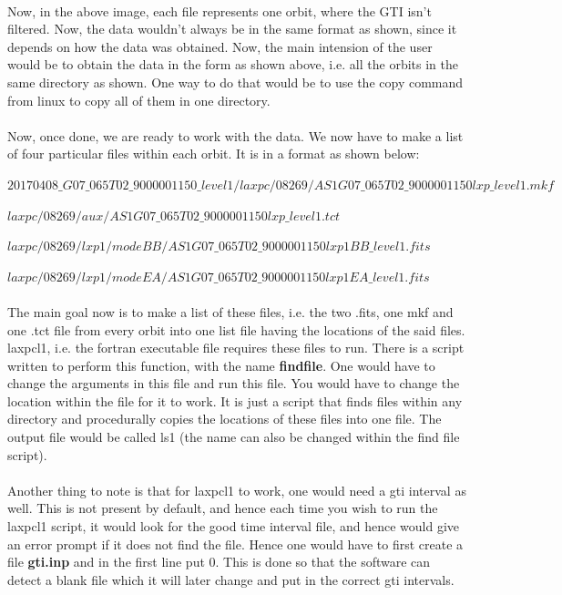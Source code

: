 \documentclass[a4paper,twoside]{report}
\numberwithin{equation}{section}
\begin{document}
\paragraph{}
Now, in the above image, each file represents one orbit, where the GTI isn't filtered. Now, the data wouldn't always be in the same format as shown, since it depends on how the data was obtained. Now, the main intension of the user would be to obtain the data in the form as shown above, i.e. all the orbits in the same directory as shown. One way to do that would be to use the copy command from linux to copy all of them in one directory.
\paragraph{}
Now, once done, we are ready to work with the data. We now have to make a list of four particular files within each orbit. It is in a format as shown below:
\begin{center}
\item {$20170408\_G07\_065T02\_9000001150\_level1/laxpc/08269/AS1G07\_065T02\_9000001150lxp\_level1.mkf$}
\item {$laxpc/08269/aux/AS1G07\_065T02\_9000001150lxp\_level1.tct$}
\item {$laxpc/08269/lxp1/modeBB/AS1G07\_065T02\_9000001150lxp1BB\_level1.fits$}
\item {$laxpc/08269/lxp1/modeEA/AS1G07\_065T02\_9000001150lxp1EA\_level1.fits$}
\end{center}
\paragraph{}
The main goal now is to make a list of these files, i.e. the two .fits, one mkf and one .tct file from every orbit into one list file having the locations of the said files. laxpcl1, i.e. the fortran executable file requires these files to run. There is a script written to perform this function, with the name \textbf{findfile}. One would have to change the arguments in this file and run this file. You would have to change the location within the file for it to work. It is just a script that finds files within any directory and procedurally copies the locations of these files into one file. The output file would be called ls1 (the name can also be changed within the find file script). 
\paragraph{}
Another thing to note is that for laxpcl1 to work, one would need a gti interval as well. This is not present by default, and hence each time you wish to run the laxpcl1 script, it would look for the good time interval file, and hence would give an error prompt if it does not find the file. Hence one would have to first create a file \textbf{gti.inp} and in the first line put $0$. This is done so that the software can detect a blank file which it will later change and put in the correct gti intervals. 
\end{document}

